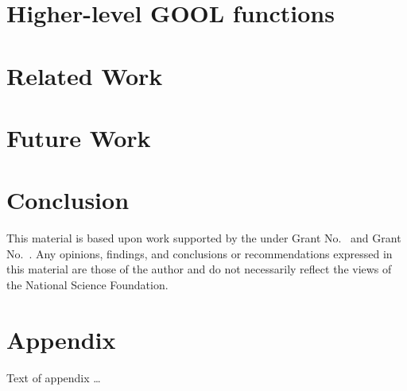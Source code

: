 \documentclass[sigplan,review,anonymous]{acmart}\settopmatter{printfolios=true,printccs=false,printacmref=false}
\begin{document}
\section{Higher-level GOOL functions} \label{patterns}
\section{Related Work} \label{related}
\section{Future Work} \label{future}
\section{Conclusion} \label{conclusions}


\begin{acks}                            %
  This material is based upon work supported by the
   under Grant
  No.~ and Grant
  No.~.  Any opinions, findings, and
  conclusions or recommendations expressed in this material are those
  of the author and do not necessarily reflect the views of the
  National Science Foundation.
\end{acks}





\appendix
\section{Appendix}

Text of appendix \ldots
\end{document}
